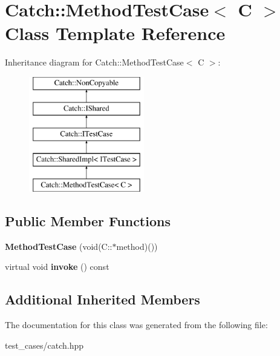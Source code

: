 \hypertarget{classCatch_1_1MethodTestCase}{}\section{Catch\+:\+:Method\+Test\+Case$<$ C $>$ Class Template Reference}
\label{classCatch_1_1MethodTestCase}
Inheritance diagram for Catch\+:\+:Method\+Test\+Case$<$ C $>$\+:\begin{figure}[H]
\begin{center}
\leavevmode
\includegraphics[height=5.000000cm]{classCatch_1_1MethodTestCase}
\end{center}
\end{figure}
\subsection*{Public Member Functions}
\begin{DoxyCompactItemize}
\item 
\mbox{\label{classCatch_1_1MethodTestCase_a7b043b85dae371358255dd9dc6582e7b}} 
{\bfseries Method\+Test\+Case} (void(C\+::$\ast$method)())
\item 
\mbox{\label{classCatch_1_1MethodTestCase_a4e2263cfa0646f2980768328cb372793}} 
virtual void {\bfseries invoke} () const
\end{DoxyCompactItemize}
\subsection*{Additional Inherited Members}


The documentation for this class was generated from the following file\+:\begin{DoxyCompactItemize}
\item 
test\+\_\+cases/catch.\+hpp\end{DoxyCompactItemize}
